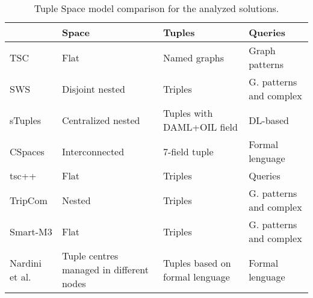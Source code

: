 

\begin{table}[htbp]
\caption{Tuple Space model comparison for the analyzed solutions.}


\begin{tabular}{ l p{3cm} p{3cm} p{3cm} }
\hline 
  & Space  & Tuples  & Queries \tabularnewline
\hline 
 TSC & Flat  & Named graphs  & Graph patterns \tabularnewline
 SWS & Disjoint nested  & Triples  & G. patterns and complex \tabularnewline
 sTuples & Centralized nested  & Tuples with DAML+OIL field  & DL-based \tabularnewline
 CSpaces & Interconnected  & 7-field tuple  & Formal lenguage \tabularnewline
 tsc++ & Flat  & Triples  & Queries \tabularnewline
 TripCom & Nested  & Triples  & G. patterns and complex \tabularnewline
 Smart-M3 & Flat  & Triples  & G. patterns and complex \tabularnewline
 Nardini et al. & Tuple centres managed in different nodes & Tuples based on formal lenguage  & Formal lenguage \tabularnewline
\hline 
\end{tabular}
\label{tab:comparisonTS}
\end{table}

